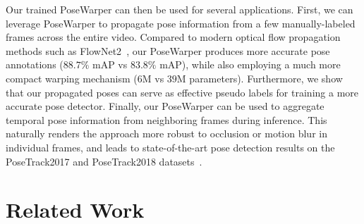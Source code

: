 \documentclass{article}
\begin{document}
Our trained PoseWarper can then be used for several applications. First, we can leverage PoseWarper to propagate pose information from a few manually-labeled frames across the entire video. Compared to modern optical flow propagation methods such as FlowNet2~\cite{DBLP:journals/corr/IlgMSKDB16}, our PoseWarper produces more accurate pose annotations ($88.7\%$ mAP vs $83.8\%$ mAP), while also employing a much more compact warping mechanism ($6$M vs $39$M parameters). Furthermore, we show that our propagated poses can serve as effective pseudo labels for training a more accurate pose detector. Finally, our PoseWarper can be used to aggregate temporal pose information from neighboring frames during inference. This naturally renders the approach more robust to occlusion or motion blur in individual frames, and leads to state-of-the-art pose detection results on the PoseTrack2017 and PoseTrack2018 datasets~\cite{Iqbal_CVPR2017}. 





 



\section{Related Work}
\end{document}
